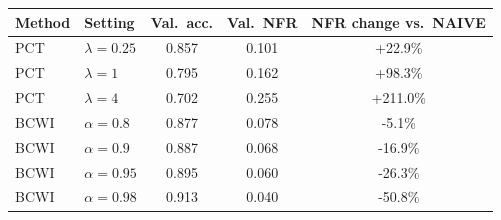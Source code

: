\begin{tabular}{llccc}
\toprule
Method & Setting & Val.\ acc. & Val.\ NFR & NFR change vs.\ NAIVE \\
\midrule
PCT & $\lambda{=}0.25$ & 0.857 & 0.101 & +22.9\% \\
PCT & $\lambda{=}1$ & 0.795 & 0.162 & +98.3\% \\
PCT & $\lambda{=}4$ & 0.702 & 0.255 & +211.0\% \\
BCWI & $\alpha{=}0.8$ & 0.877 & 0.078 & -5.1\% \\
BCWI & $\alpha{=}0.9$ & 0.887 & 0.068 & -16.9\% \\
BCWI & $\alpha{=}0.95$ & 0.895 & 0.060 & -26.3\% \\
BCWI & $\alpha{=}0.98$ & 0.913 & 0.040 & -50.8\% \\
\bottomrule
\end{tabular}